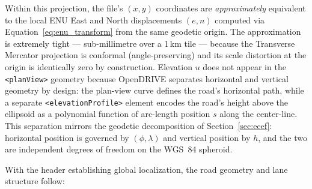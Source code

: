 \documentclass{book}
\begin{document}
Within this projection, the file's $(x, y)$ coordinates are
\emph{approximately} equivalent to the local ENU East and North
displacements $(e, n)$ computed via Equation~\eqref{eq:enu_transform}
from the same geodetic origin.  The approximation is extremely tight
--- sub-millimetre over a 1\,km tile --- because the Transverse
Mercator projection is conformal (angle-preserving) and its scale
distortion at the origin is identically zero by construction.
Elevation $u$ does not appear in the \texttt{<planView>} geometry
because OpenDRIVE separates horizontal and vertical geometry by
design: the plan-view curve defines the road's horizontal path, while
a separate \texttt{<elevationProfile>} element encodes the road's
height above the ellipsoid as a polynomial function of arc-length
position $s$ along the center-line.  This separation mirrors the
geodetic decomposition of Section~\ref{sec:ecef}: horizontal position
is governed by $(\phi, \lambda)$ and vertical position by $h$, and
the two are independent degrees of freedom on the WGS~84 spheroid.

With the header establishing global localization, the road geometry
and lane structure follow:
\end{document}
